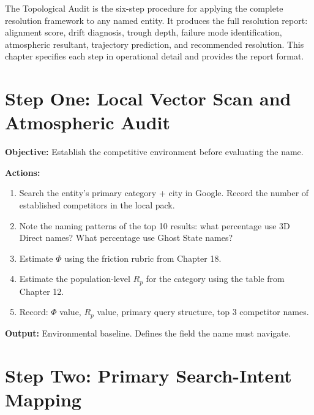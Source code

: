 \documentclass[12pt, openany]{book}
\theoremstyle{thmstyle}
\theoremstyle{defstyle}
\begin{document}
\begin{keybox}
The Topological Audit is the six-step procedure for applying the complete resolution framework to any named entity. It produces the full resolution report: alignment score, drift diagnosis, trough depth, failure mode identification, atmospheric resultant, trajectory prediction, and recommended resolution. This chapter specifies each step in operational detail and provides the report format.
\end{keybox}

\section{Step One: Local Vector Scan and Atmospheric Audit}

\begin{auditbox}
\textbf{Objective:} Establish the competitive environment before evaluating the name.

\textbf{Actions:}
\begin{enumerate}[leftmargin=1.5em, topsep=2pt]
  \item Search the entity's primary category + city in Google. Record the number of established competitors in the local pack.
  \item Note the naming patterns of the top 10 results: what percentage use 3D Direct names? What percentage use Ghost State names?
  \item Estimate $\Phi$ using the friction rubric from Chapter 18.
  \item Estimate the population-level $R_p$ for the category using the table from Chapter 12.
  \item Record: $\Phi$ value, $R_p$ value, primary query structure, top 3 competitor names.
\end{enumerate}

\textbf{Output:} Environmental baseline. Defines the field the name must navigate.
\end{auditbox}

\section{Step Two: Primary Search-Intent Mapping}
\end{document}
